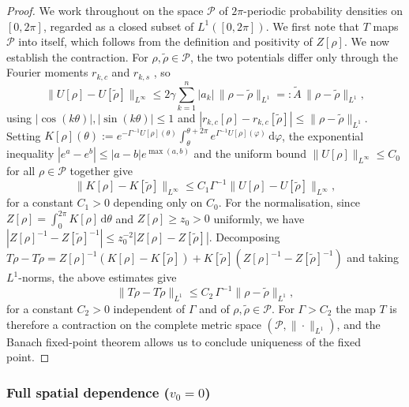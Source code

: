 \documentclass[a4paper,11pt]{article}
\theoremstyle{plain}
\theoremstyle{definition}
\theoremstyle{remark}
\begin{document}
\begin{proof}
We work throughout on the space $\mathcal{P}$ of $2\pi$-periodic probability densities on $[0,2\pi]$, regarded as a closed subset of $L^1([0,2\pi])$. We first note that $T$ maps $\mathcal{P}$ into itself, which follows from the definition and positivity of $Z[\rho]$. We now establish the contraction. For $\rho,\tilde\rho\in\mathcal{P}$, the two potentials differ only through the Fourier moments $r_{k,c}$ and $r_{k,s}$ , so
\begin{equation}\label{eq:U-Lip}
    \|U[\rho]-U[\tilde\rho]\|_{L^\infty} \leq 2\gamma\sum_{k=1}^n |a_k|\,\|\rho-\tilde\rho\|_{L^1} =: \tilde{A}\,\|\rho-\tilde\rho\|_{L^1},
\end{equation}
using $|\cos(k\theta)|,|\sin(k\theta)|\leq 1$ and $|r_{k,c}[\rho]-r_{k,c}[\tilde\rho]|\leq\|\rho-\tilde\rho\|_{L^1}$. Setting $K[\rho](\theta) := e^{-\Gamma^{-1}U[\rho](\theta)}\int_\theta^{\theta+2\pi}e^{\Gamma^{-1}U[\rho](\varphi)}\,\mathrm{d}\varphi$, the exponential inequality $|e^a - e^b| \leq |a-b|e^{\max(a,b)}$ and the uniform bound $\|U[\rho]\|_{L^\infty}\leq C_0$ for all $\rho\in\mathcal{P}$ together give
\[
    \|K[\rho]-K[\tilde\rho]\|_{L^\infty} \leq C_1\Gamma^{-1}\|U[\rho]-U[\tilde\rho]\|_{L^\infty},
\]
for a constant $C_1 > 0$ depending only on $C_0$. For the normalisation, since $Z[\rho] = \int_0^{2\pi}K[\rho]\,\mathrm{d}\theta$ and $Z[\rho]\geq z_0>0$ uniformly, we have $|Z[\rho]^{-1} - Z[\tilde\rho]^{-1}|\leq z_0^{-2}|Z[\rho]-Z[\tilde\rho]|$. Decomposing $T\rho - T\tilde\rho = Z[\rho]^{-1}(K[\rho]-K[\tilde\rho]) + K[\tilde\rho](Z[\rho]^{-1}-Z[\tilde\rho]^{-1})$ and taking $L^1$-norms, the above estimates give
\[
    \|T\rho - T\tilde\rho\|_{L^1} \leq C_2\,\Gamma^{-1}\|\rho-\tilde\rho\|_{L^1},
\]
for a constant $C_2>0$ independent of $\Gamma$ and of $\rho,\tilde\rho\in\mathcal{P}$. For $\Gamma > C_2$ the map $T$ is therefore a contraction on the complete metric space $(\mathcal{P},\|\cdot\|_{L^1})$, and the Banach fixed-point theorem allows us to conclude uniqueness of the fixed point.
\end{proof}

\subsubsection{Full spatial dependence ($v_0 = 0$)}\label{subsubsec:full-spatial}
\end{document}
